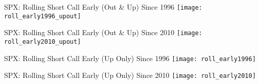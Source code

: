 \documentclass{beamer}
\begin{document}
\begin{frame}{SPX: Rolling Short Call Early (Out \& Up) Since 1996}
\texttt{[image: roll\_early1996\_upout]}
\end{frame}

\begin{frame}{SPX: Rolling Short Call Early  (Out \& Up) Since 2010}
\texttt{[image: roll\_early2010\_upout]}
\end{frame}

\begin{frame}{SPX: Rolling Short Call Early (Up Only) Since 1996}
\texttt{[image: roll\_early1996]}
\end{frame}

\begin{frame}{SPX: Rolling Short Call Early (Up Only) Since 2010}
\texttt{[image: roll\_early2010]}
\end{frame}
\end{document}
